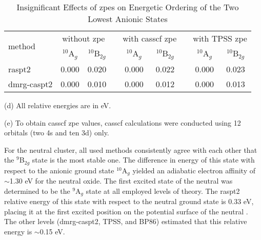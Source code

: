 \begin{refsection}
\FloatBarrier

\begin{table}[htb!]
	\centering
	\label{zpe}
	\begin{threeparttable}
	\caption{Insignificant Effects of \acrshort{zpe}s on Energetic Ordering of the Two Lowest Anionic States}
	\begin{tabular}{@{}lcclcclcc@{}}
		\toprule
		\multirow{2}{*}{method} & \multicolumn{2}{c}{without \acrshort{zpe}} &  & \multicolumn{2}{c}{with \acrshort{casscf} \acrshort{zpe}\tnote{(e)}} &  & \multicolumn{2}{c}{with TPSS \acrshort{zpe}} \\ \cmidrule(lr){2-3} \cmidrule(lr){5-6} \cmidrule(l){8-9}  
		             & $^{10}$A$_g$  & $^{10}$B$_{2g}$ &  & $^{10}$A$_g$ & $^{10}$B$_{2g}$ &  & $^{10}$A$_g$  & $^{10}$B$_{2g}$ \\ \midrule 
		\acrshort{raspt2}       & 0.000         & 0.020    &  & 0.000        & 0.022           &  & 0.000         & 0.023           \\
		\acrshort{dmrg}-\acrshort{caspt2}  & 0.000         & 0.010    &  & 0.000        & 0.012           &  & 0.000         & 0.013           \\ \bottomrule
	\end{tabular}
\begin{tablenotes}
	\item[(d)] All relative energies are in eV.
	\item[(e)] To obtain \acrshort{casscf} \acrshort{zpe} values, \acrshort{casscf} calculations were conducted using 12 orbitals (two 4s and ten 3d) only.
\end{tablenotes}
\end{threeparttable}
\end{table}




For the neutral cluster, all used methods consistently agree with each other that the $^9$B$_{2g}$ state is the most stable one. The difference in energy of this state with respect to the anionic ground state $^{10}$A$_g$ yielded an adiabatic electron affinity of $\sim$1.30 eV for the neutral oxide. The first excited state of the neutral  was determined to be the $^9$A$_g$ state at all employed levels of theory. The \acrshort{raspt2} relative energy of this state with respect to the neutral ground state is 0.33 eV, placing it at the first excited position on the potential surface of the neutral . The other levels (\acrshort{dmrg}-\acrshort{caspt2}, TPSS, and BP86) estimated that this relative energy is $\sim$0.15 eV.







\end{refsection}
